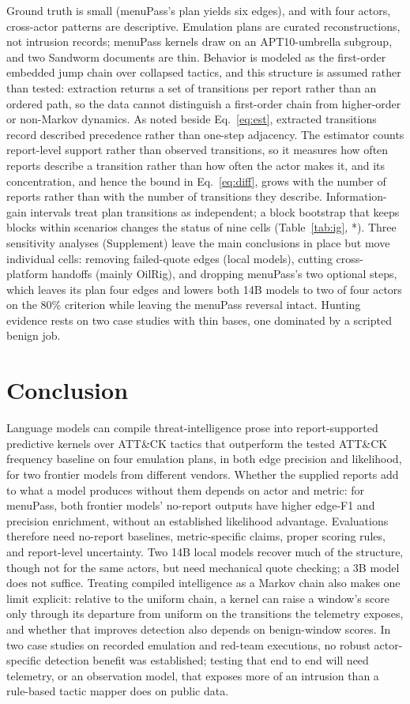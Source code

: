 \documentclass[letterpaper]{article}
\begin{document}
Ground truth is small (menuPass's plan yields six edges), and with four actors, cross-actor patterns are descriptive. Emulation plans are curated reconstructions, not intrusion records; menuPass kernels draw on an APT10-umbrella subgroup, and two Sandworm documents are thin. Behavior is modeled as the first-order embedded jump chain over collapsed tactics, and this structure is assumed rather than tested: extraction returns a set of transitions per report rather than an ordered path, so the data cannot distinguish a first-order chain from higher-order or non-Markov dynamics. As noted beside Eq.~\eqref{eq:est}, extracted transitions record described precedence rather than one-step adjacency. The estimator counts report-level support rather than observed transitions, so it measures how often reports describe a transition rather than how often the actor makes it, and its concentration, and hence the bound in Eq.~\eqref{eq:diff}, grows with the number of reports rather than with the number of transitions they describe. Information-gain intervals treat plan transitions as independent; a block bootstrap that keeps blocks within scenarios changes the status of nine cells (Table~\ref{tab:ig}, *). Three sensitivity analyses (Supplement) leave the main conclusions in place but move individual cells: removing failed-quote edges (local models), cutting cross-platform handoffs (mainly OilRig), and dropping menuPass's two optional steps, which leaves its plan four edges and lowers both 14B models to two of four actors on the 80\% criterion while leaving the menuPass reversal intact. Hunting evidence rests on two case studies with thin bases, one dominated by a scripted benign job.

\section{Conclusion}

Language models can compile threat-intelligence prose into report-supported predictive kernels over ATT\&CK tactics that outperform the tested ATT\&CK frequency baseline on four emulation plans, in both edge precision and likelihood, for two frontier models from different vendors. Whether the supplied reports add to what a model produces without them depends on actor and metric: for menuPass, both frontier models' no-report outputs have higher edge-F1 and precision enrichment, without an established likelihood advantage. Evaluations therefore need no-report baselines, metric-specific claims, proper scoring rules, and report-level uncertainty. Two 14B local models recover much of the structure, though not for the same actors, but need mechanical quote checking; a 3B model does not suffice. Treating compiled intelligence as a Markov chain also makes one limit explicit: relative to the uniform chain, a kernel can raise a window's score only through its departure from uniform on the transitions the telemetry exposes, and whether that improves detection also depends on benign-window scores. In two case studies on recorded emulation and red-team executions, no robust actor-specific detection benefit was established; testing that end to end will need telemetry, or an observation model, that exposes more of an intrusion than a rule-based tactic mapper does on public data.



\end{document}
